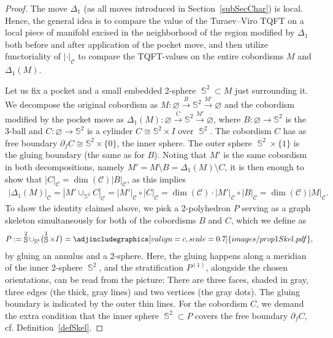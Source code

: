 \documentclass[10pt,a4paper]{amsart}
\DeclareMathOperator{\Sp}{\mathbb{S}}
\numberwithin{equation}{section}
\theoremstyle{definition}
\begin{document}
 \begin{proof}
 The move $\Delta_1$ (as all moves introduced in Section~\ref{subSecChar}) is local. Hence, the general idea is to compare the value of the Turaev--Viro TQFT on a local piece of manifold excised in the neighborhood of the region modified by $\Delta_1$ both before and after application of the pocket move, and then utilize functoriality of $|\cdot |_{\mathcal{C}}$ to compare the TQFT-values on the entire cobordisms $M$ and $\Delta_1(M)$.

 Let us fix a pocket and a small embedded 2-sphere $\Sp^2 \subset M$ just surrounding it. We decompose the original cobordism as $M\colon \varnothing \xrightarrow{B} \mathbb{S}^2 \xrightarrow{M'} \varnothing$ and the cobordism modified by the pocket move as $\Delta_1(M)\colon \varnothing \xrightarrow{C} \mathbb{S}^2 \xrightarrow{M'} \varnothing$, where $B\colon \varnothing \rightarrow \mathbb{S}^2$ is the 3-ball and $C\colon \varnothing \rightarrow \mathbb{S}^2$ is a cylinder $C \cong \mathbb{S}^2 \times I$ over $\Sp^2$. The cobordism $C$ has as free boundary $\partial_fC \cong \mathbb{S}^2 \times \{0\}$, the inner sphere. The outer sphere $\Sp^2 \times \{1\}$ is the gluing boundary (the same as for $B$). Noting that $M'$ is the same cobordism in both decompositions, namely $M' = M \setminus B = \Delta_1(M) \setminus C$, it is then enough to show that $|C|_{\mathcal{C}} = \dim(\mathcal{C})|B|_{\mathcal{C}}$, as this implies
 \begin{align*}
 |\Delta_1(M)|_{\mathcal{C}} = |M' \cup_{\mathbb{S}^2} C|_{\mathcal{C}} = |M'|_{\mathcal{C}} \circ |C|_{\mathcal{C}} = \dim(\mathcal{C})\cdot |M'|_{\mathcal{C}} \circ |B|_{\mathcal{C}} = \dim(\mathcal{C})|M|_{\mathcal{C}}.
 \end{align*}
 To show the identity claimed above, we pick a 2-polyhedron $P$ serving as a graph skeleton simultaneously for both of the cobordisms $B$ and $C$, which we define as
 \begin{align*}
 P := \Sp^2 \cup_{\Sp^1} \bigl(\Sp^1 \times I\bigr) = \adjincludegraphics[valign=c, scale = 0.7]{images/prop1Skel.pdf},
 \end{align*}
 by gluing an annulus and a 2-sphere. Here, the gluing happens along a meridian of the inner 2-sphere $\Sp^2$, and the stratification $P^{(1)}$, alongside the chosen orientations, can be read from the picture: There are three faces, shaded in gray, three edges (the thick, gray lines) and two vertices (the gray dots). The gluing boundary is indicated by the outer thin lines. For the cobordism $C$, we demand the extra condition that the inner sphere $\Sp^2 \subset P$ covers the free boundary $\partial_fC$, cf. Definition~\ref{defSkel}.


\end{proof}
\end{document}

